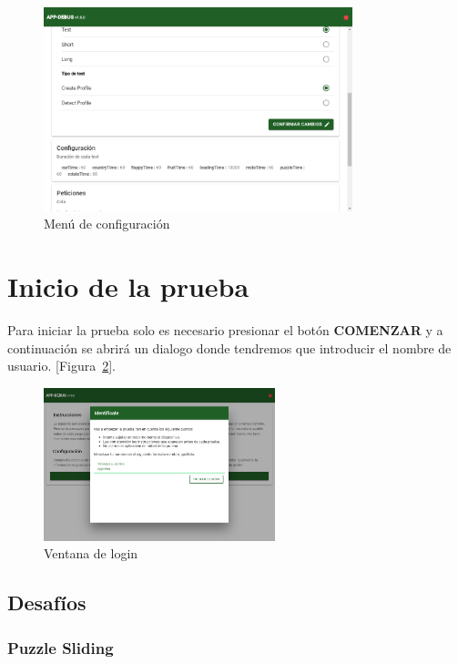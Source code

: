 \begin{figure}[!h]
    \centering
    \includegraphics[width=0.8\textwidth, keepaspectratio]{imaxes/application/config_page.png}
    \caption{Menú de configuración}
    \label{fig:config_page}
\end{figure}

\newpage
\section{Inicio de la prueba}

Para iniciar la prueba solo es necesario presionar el botón \textbf{COMENZAR} y a continuación se abrirá un dialogo donde tendremos que introducir el nombre de usuario. [Figura~\ref{fig:login_page}]. 

\begin{figure}[!h]
    \centering
    \includegraphics[width=0.6\textwidth, keepaspectratio]{imaxes/application/login_page.png}
    \caption{Ventana de login}
    \label{fig:login_page}
\end{figure}

\subsection{Desafíos}

\subsubsection{Puzzle Sliding}

